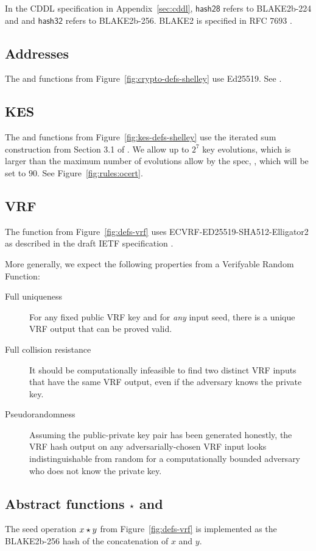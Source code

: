 In the CDDL specification in Appendix~\ref{sec:cddl},
$\mathsf{hash28}$ refers to BLAKE2b-224 and
and $\mathsf{hash32}$ refers to BLAKE2b-256.
BLAKE2 is specified in RFC 7693 \cite{rfcBLAKE2}.

\subsection{Addresses}
\label{sec:app-addresses}
The  and  functions from Figure~\ref{fig:crypto-defs-shelley}
use Ed25519. See \cite{rfcEdDSA}.

\subsection{KES}
The  and  functions from Figure~\ref{fig:kes-defs-shelley}
use the iterated sum construction from Section 3.1 of \cite{cryptoeprint:2001:034}.
We allow up to $2^7$ key evolutions, which is larger than the maximum number
of evolutions allow by the spec, \MaxKESEvo, which will be set to $90$.
See Figure~\ref{fig:rules:ocert}.

\subsection{VRF}
\label{sec:app-vrf}
The  function from Figure~\ref{fig:defs-vrf}
uses ECVRF-ED25519-SHA512-Elligator2 as described in the draft IETF specification
\cite{rfcVRFDraft}.

More generally, we expect the following properties from a Verifyable Random Function: 
\begin{description}
\item[Full uniqueness] For any fixed public VRF key and for \textit{any} input seed, there is a unique VRF output that can be proved valid. 
\item[Full collision resistance] It should be computationally infeasible to find two distinct VRF inputs that have the same VRF output, even if the adversary knows the private key. 
\item[Pseudorandomness] Assuming the public-private key pair has been generated honestly, the VRF hash output on any adversarially-chosen VRF input looks indistinguishable from random for a computationally bounded adversary who does not know the private key. 
\end{description}

\subsection{Abstract functions $\star$ and }
\label{sec:mkseed-slottoseed}
The seed operation $x \star y$ from Figure~\ref{fig:defs-vrf} is implemented
as the BLAKE2b-256 hash of the concatenation of $x$ and $y$.

